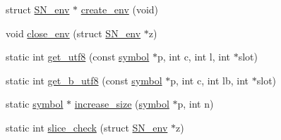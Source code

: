 \begin{DoxyCompactItemize}
struct \mbox{\hyperlink{structirk_1_1porter2_1_1SN__env}{S\+N\+\_\+env}} $\ast$ \mbox{\hyperlink{namespaceirk_1_1porter2_a8ba24ffb1a390ffd49feb3350a538559}{create\+\_\+env}} (void)
\item 
void \mbox{\hyperlink{namespaceirk_1_1porter2_a4821a9be9d6035025dc0536db28d129c}{close\+\_\+env}} (struct \mbox{\hyperlink{structirk_1_1porter2_1_1SN__env}{S\+N\+\_\+env}} $\ast$z)
\item 
static int \mbox{\hyperlink{namespaceirk_1_1porter2_a2d7c3ab19addd92a4fc0c77a44e2e84e}{get\+\_\+utf8}} (const \mbox{\hyperlink{namespaceirk_1_1porter2_afd04c4eb58a1dabcf8f3ab2d7e9f9ed5}{symbol}} $\ast$p, int c, int l, int $\ast$slot)
\item 
static int \mbox{\hyperlink{namespaceirk_1_1porter2_a7cba9ed5de039680320ccb6c08077787}{get\+\_\+b\+\_\+utf8}} (const \mbox{\hyperlink{namespaceirk_1_1porter2_afd04c4eb58a1dabcf8f3ab2d7e9f9ed5}{symbol}} $\ast$p, int c, int lb, int $\ast$slot)
\item 
static \mbox{\hyperlink{namespaceirk_1_1porter2_afd04c4eb58a1dabcf8f3ab2d7e9f9ed5}{symbol}} $\ast$ \mbox{\hyperlink{namespaceirk_1_1porter2_ae8cb7033f13a3cf4bb0b904f66a1ebb1}{increase\+\_\+size}} (\mbox{\hyperlink{namespaceirk_1_1porter2_afd04c4eb58a1dabcf8f3ab2d7e9f9ed5}{symbol}} $\ast$p, int n)
\item 
static int \mbox{\hyperlink{namespaceirk_1_1porter2_a321ee286179634f1bf3743529a7443e0}{slice\+\_\+check}} (struct \mbox{\hyperlink{structirk_1_1porter2_1_1SN__env}{S\+N\+\_\+env}} $\ast$z)
\end{DoxyCompactItemize}

